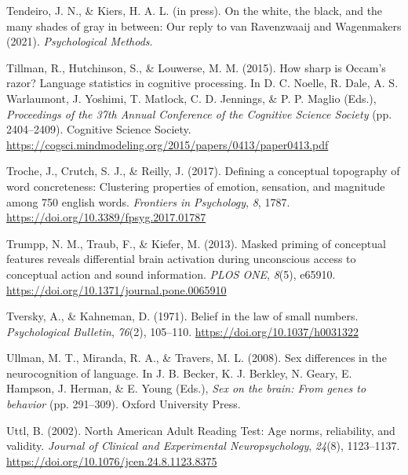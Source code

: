 \documentclass[
  12pt,
  man,floatsintext]{apa7}
\newlength{\cslhangindent}
\newlength{\cslentryspacingunit} %
\newenvironment{CSLReferences}[2] %
 {%
  \setlength{\parindent}{0pt}
  \ifodd #1
  \let\oldpar\par
  \def\par{\hangindent=\cslhangindent\oldpar}
  \fi
  \setlength{\parskip}{#2\cslentryspacingunit}
 }%
 {}
\begin{document}
\begin{CSLReferences}{1}{0}
\leavevmode{}%
Tendeiro, J. N., \& Kiers, H. A. L. (in press). On the white, the black, and the many shades of gray in between: {Our} reply to van {Ravenzwaaij} and {Wagenmakers} (2021). \emph{Psychological Methods}.

\leavevmode{}%
Tillman, R., Hutchinson, S., \& Louwerse, M. M. (2015). How sharp is {Occam}'s razor? {Language} statistics in cognitive processing. In D. C. Noelle, R. Dale, A. S. Warlaumont, J. Yoshimi, T. Matlock, C. D. Jennings, \& P. P. Maglio (Eds.), \emph{Proceedings of the 37th {Annual Conference} of the {Cognitive Science Society}} (pp. 2404--2409). {Cognitive Science Society}. \url{https://cogsci.mindmodeling.org/2015/papers/0413/paper0413.pdf}

\leavevmode{}%
Troche, J., Crutch, S. J., \& Reilly, J. (2017). Defining a conceptual topography of word concreteness: {Clustering} properties of emotion, sensation, and magnitude among 750 english words. \emph{Frontiers in Psychology}, \emph{8}, 1787. \url{https://doi.org/10.3389/fpsyg.2017.01787}

\leavevmode{}%
Trumpp, N. M., Traub, F., \& Kiefer, M. (2013). Masked priming of conceptual features reveals differential brain activation during unconscious access to conceptual action and sound information. \emph{PLOS ONE}, \emph{8}(5), e65910. \url{https://doi.org/10.1371/journal.pone.0065910}

\leavevmode{}%
Tversky, A., \& Kahneman, D. (1971). Belief in the law of small numbers. \emph{Psychological Bulletin}, \emph{76}(2), 105--110. \url{https://doi.org/10.1037/h0031322}

\leavevmode{}%
Ullman, M. T., Miranda, R. A., \& Travers, M. L. (2008). Sex differences in the neurocognition of language. In J. B. Becker, K. J. Berkley, N. Geary, E. Hampson, J. Herman, \& E. Young (Eds.), \emph{Sex on the brain: {From} genes to behavior} (pp. 291--309). {Oxford University Press}.

\leavevmode{}%
Uttl, B. (2002). North {American Adult Reading Test}: {Age} norms, reliability, and validity. \emph{Journal of Clinical and Experimental Neuropsychology}, \emph{24}(8), 1123--1137. \url{https://doi.org/10.1076/jcen.24.8.1123.8375}


\end{CSLReferences}
\end{document}
